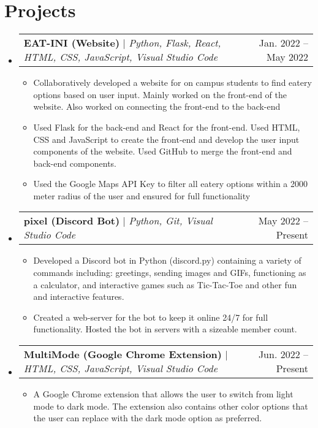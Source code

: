 \documentclass[letterpaper,11pt]{article}
\makeatletter
\newcommand{\resumeItem}[1]{
  \item\small{
    {#1 \vspace{-5pt}}
  }
}
\newcommand{\resumeProjectHeading}[2]{
    \item
    \begin{tabular*}{0.97\textwidth}{l@{\extracolsep{\fill}}r}
      \small#1 & #2 \\
    \end{tabular*}\vspace{-8pt}
}
\newcommand{\resumeSubHeadingListStart}{\begin{itemize}[leftmargin=0.10in, label={}]}
\newcommand{\resumeSubHeadingListEnd}{\end{itemize}}
\newcommand{\resumeItemListStart}{\begin{itemize}}
\newcommand{\resumeItemListEnd}{\end{itemize}\vspace{-5pt}}
\makeatother
\begin{document}
\section{Projects}
    \resumeSubHeadingListStart
      \resumeProjectHeading
          {\textbf{EAT-INI (Website)} $|$ \emph{Python, Flask, React, HTML, CSS, JavaScript, Visual Studio Code}}{Jan. 2022 -- May 2022}
          \resumeItemListStart
            \resumeItem{Collaboratively developed a website for on campus students to find eatery options based on user input. Mainly worked on the front-end of the website. Also worked on connecting the front-end to the back-end}
            \resumeItem{Used Flask for the back-end and React for the front-end. Used HTML, CSS and JavaScript to create the front-end and develop the user input components of the website. Used GitHub to merge the front-end and back-end components.}
            \resumeItem{Used the Google Maps API Key to filter all eatery options within a 2000 meter radius of the user and ensured for full functionality}
          \resumeItemListEnd
      \resumeProjectHeading
          {\textbf{pixel (Discord Bot)} $|$ \emph{Python, Git, Visual Studio Code}}{May 2022 -- Present}
          \resumeItemListStart
            \resumeItem{Developed a Discord bot in Python (discord.py) containing a variety of commands including: greetings, sending images and GIFs, functioning as a calculator, and interactive games such as Tic-Tac-Toe and other fun and interactive features.}
            \resumeItem{Created a web-server for the bot to keep it online 24/7 for full functionality. Hosted the bot in servers with a sizeable member count.}
          \resumeItemListEnd
        \resumeProjectHeading
          {\textbf{MultiMode (Google Chrome Extension)} $|$ \emph{HTML, CSS, JavaScript, Visual Studio Code}}{Jun. 2022 -- Present}
          \resumeItemListStart
            \resumeItem{A Google Chrome extension that allows the user to switch from light mode to dark mode. The extension also contains other color options that the user can replace with the dark mode option as preferred.}
            \resumeItemListEnd
    \resumeSubHeadingListEnd

\end{document}
